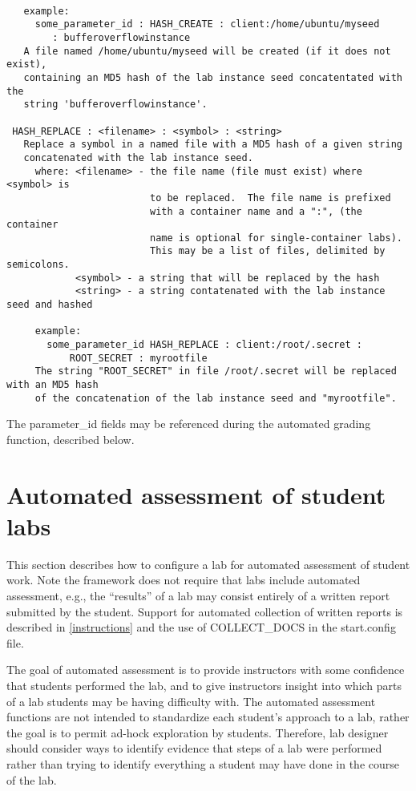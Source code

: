\documentclass[12pt]{article}
\begin{document}
\begin{verbatim}
                   
   example:
     some_parameter_id : HASH_CREATE : client:/home/ubuntu/myseed 
        : bufferoverflowinstance
   A file named /home/ubuntu/myseed will be created (if it does not exist), 
   containing an MD5 hash of the lab instance seed concatentated with the 
   string 'bufferoverflowinstance'.
 
 HASH_REPLACE : <filename> : <symbol> : <string>
   Replace a symbol in a named file with a MD5 hash of a given string 
   concatenated with the lab instance seed.
     where: <filename> - the file name (file must exist) where <symbol> is 
                         to be replaced.  The file name is prefixed 
                         with a container name and a ":", (the container 
                         name is optional for single-container labs).  
                         This may be a list of files, delimited by semicolons. 
            <symbol> - a string that will be replaced by the hash
            <string> - a string contatenated with the lab instance seed and hashed

     example:
       some_parameter_id HASH_REPLACE : client:/root/.secret : 
           ROOT_SECRET : myrootfile
     The string "ROOT_SECRET" in file /root/.secret will be replaced with an MD5 hash
     of the concatenation of the lab instance seed and "myrootfile".
\end{verbatim}

The parameter\_id fields may be referenced during the automated grading function, described below. 


\section{Automated assessment of student labs}
This section describes how to configure a lab for automated assessment of student work.
Note the framework does not require that labs include automated assessment, e.g., the
``results'' of a lab may consist entirely of a written report submitted by the student.
Support for automated collection of written reports is described in \ref{instructions}
and the use of COLLECT\_DOCS in the start.config file.

The goal of automated assessment is to provide instructors with some confidence that 
students performed the lab, and to give instructors insight into which parts
of a lab students may be having difficulty with.  The automated assessment functions are
not intended to standardize each student's approach to a lab, rather the goal is to permit
ad-hock exploration by students.  Therefore, lab designer should consider ways to identify
evidence that steps of a lab were performed rather than trying to identify everything a student
may have done in the course of the lab.
\end{document}
